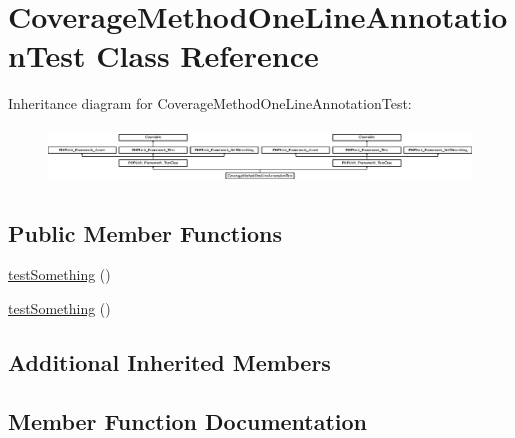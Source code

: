 \hypertarget{class_coverage_method_one_line_annotation_test}{}\section{Coverage\+Method\+One\+Line\+Annotation\+Test Class Reference}
\label{class_coverage_method_one_line_annotation_test}
Inheritance diagram for Coverage\+Method\+One\+Line\+Annotation\+Test\+:\begin{figure}[H]
\begin{center}
\leavevmode
\includegraphics[height=1.499331cm]{class_coverage_method_one_line_annotation_test}
\end{center}
\end{figure}
\subsection*{Public Member Functions}
\begin{DoxyCompactItemize}
\item 
\mbox{\hyperlink{class_coverage_method_one_line_annotation_test_a0fc4e17369bc9607ebdd850d9eda8167}{test\+Something}} ()
\item 
\mbox{\hyperlink{class_coverage_method_one_line_annotation_test_a0fc4e17369bc9607ebdd850d9eda8167}{test\+Something}} ()
\end{DoxyCompactItemize}
\subsection*{Additional Inherited Members}


\subsection{Member Function Documentation}
\mbox{\label{class_coverage_method_one_line_annotation_test_a0fc4e17369bc9607ebdd850d9eda8167}} 
